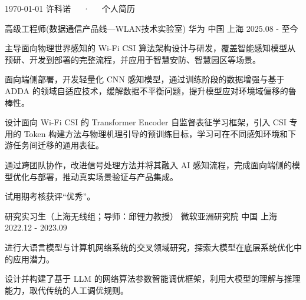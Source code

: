 \documentclass[11pt, a4paper]{awesome-cv-cn}
\begin{document}
\makecvheader

\makecvfooter
  {\today}
  {许科诺~~~·~~~个人简历}
  {\thepage}



\begin{cventries}
	
	\cventry
	{高级工程师(数据通信产品线—WLAN技术实验室)} %
	{华为} %
	{中国 上海} %
	{2025.08 - 至今} %
	{
		\begin{cvitems} %
			\item {主导面向物理世界感知的 Wi-Fi CSI 算法架构设计与研发，覆盖智能感知模型从预研、开发到部署的完整流程，并应用于智慧安防、智慧园区等场景。}
			\item {面向端侧部署，开发轻量化 CNN 感知模型，通过训练阶段的数据增强与基于 ADDA 的领域自适应技术，缓解数据不平衡问题，提升模型应对环境域偏移的鲁棒性。}
			\item {设计面向 Wi-Fi CSI 的 Transformer Encoder 自监督表征学习框架，引入 CSI 专用的 Token 构建方法与物理机理引导的预训练目标，学习可在不同感知环境和下游任务间迁移的通用表征。}
			\item {通过跨团队协作，改进信号处理方法并将其融入 AI 感知流程，完成面向端侧的模型优化与部署，推动真实场景验证与产品集成。}
			\item {试用期考核获评“优秀”。}
		\end{cvitems}
	}
	
	\cventry
	{研究实习生（上海无线组；导师：邱锂力教授）} %
	{微软亚洲研究院} %
	{中国 上海} %
	{2022.12 - 2023.09} %
	{
		\begin{cvitems} %
			\item {进行大语言模型与计算机网络系统的交叉领域研究，探索大模型在底层系统优化中的应用潜力。}
			\item {设计并构建了基于 LLM 的网络算法参数智能调优框架，利用大模型的理解与推理能力，取代传统的人工调优规则。}
		\end{cvitems}
	}
	
\end{cventries}
\end{document}
